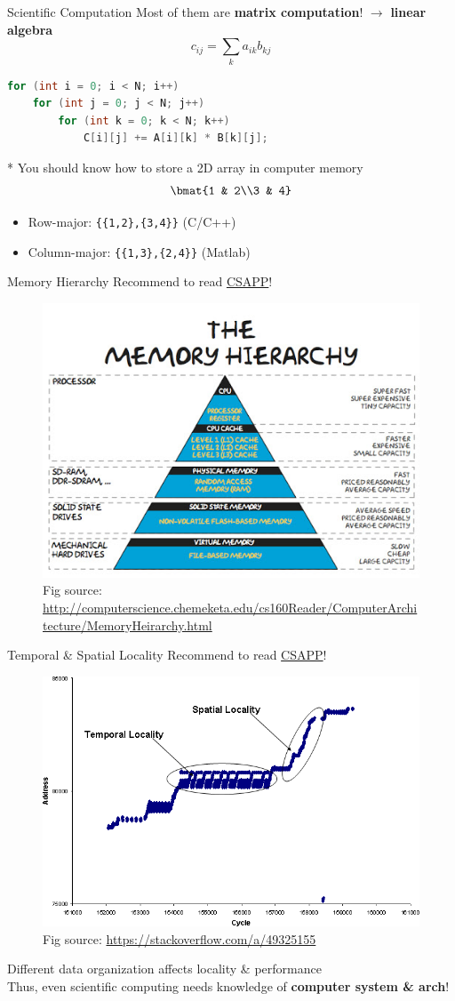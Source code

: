 \documentclass{../TexTemplate/myslide}
\begin{document}
\begin{frame}[fragile]{Scientific Computation}
Most of them are \textbf{matrix computation}! $\to$ \textbf{linear algebra}
\[c_{ij}=\sum_k a_{ik}b_{kj}\]
\begin{lstlisting}[language=c++]
for (int i = 0; i < N; i++)
    for (int j = 0; j < N; j++)
        for (int k = 0; k < N; k++)
            C[i][j] += A[i][k] * B[k][j];
\end{lstlisting}
* You should know how to store a 2D array in computer memory
\[\bmat{1 & 2\\3 & 4}\]
\begin{itemize}
	\item Row-major: \verb'{{1,2},{3,4}}' (C/C++)
	\item Column-major: \verb'{{1,3},{2,4}}' (Matlab)
\end{itemize}
\end{frame}

\begin{frame}{Memory Hierarchy}
Recommend to read \href{https://csapp.cs.cmu.edu/}{CSAPP}!
\begin{figure}
\centering
\includegraphics[width=0.6\linewidth]{fig/memory_hierarchy.jpg}
\caption*{\scriptsize Fig source: \url{http://computerscience.chemeketa.edu/cs160Reader/ComputerArchitecture/MemoryHeirarchy.html}}
\end{figure}
\end{frame}

\begin{frame}{Temporal \& Spatial Locality}
Recommend to read \href{https://csapp.cs.cmu.edu/}{CSAPP}!
\begin{figure}
\centering
\includegraphics[width=0.5\linewidth]{fig/locality.png}
\caption*{\scriptsize Fig source: \url{https://stackoverflow.com/a/49325155}}
\end{figure}
Different data organization affects locality \& performance\\
Thus, even scientific computing needs knowledge of \textbf{computer system \& arch}!
\end{frame}
\end{document}
